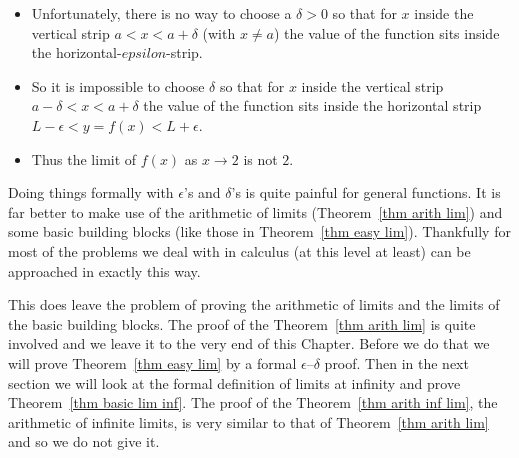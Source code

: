 \begin{eg}
\begin{itemize}
\item Unfortunately, there is no way to choose a $\delta>0$ so that for $x$
inside the vertical strip $a<x<a+\delta$ (with $x \neq a$) the value of the
function sits inside the horizontal-$epsilon$-strip.

\item So it is impossible to choose $\delta$ so that for $x$ inside the
vertical strip $a-\delta < x < a+\delta$ the value of the function sits inside
the horizontal strip $L-\epsilon < y=f(x) < L+\epsilon$.

\item Thus the limit of $f(x)$ as $x \to 2$ is not $2$.
\end{itemize}
\end{eg}

Doing things formally with $\epsilon$'s and $\delta$'s is quite painful for
general functions. It is far better to make use of the arithmetic of limits
(Theorem~\ref{thm arith lim}) and some basic building blocks (like those in
Theorem~\ref{thm easy lim}). Thankfully for most of the problems we deal with in
calculus (at this level at least) can be approached in exactly this way.

This does leave the problem of proving the arithmetic of limits and the limits
of the basic building blocks. The proof of the Theorem~\ref{thm arith lim} is
quite involved and we leave it to the very end of this Chapter. Before we do
that we will prove Theorem~\ref{thm easy lim} by a formal $\epsilon$--$\delta$
proof. Then in the next section we will look at the formal definition of limits
at infinity and prove Theorem~\ref{thm basic lim inf}. The proof of the
Theorem~\ref{thm arith inf lim}, the arithmetic of infinite limits, is very
similar to that of Theorem~\ref{thm arith lim} and so we do not give it.

